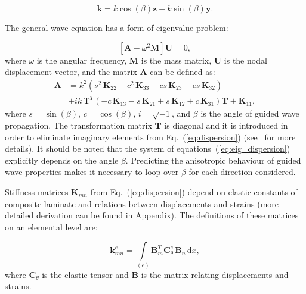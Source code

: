 \documentclass[preprint,12pt]{elsarticle}
\newcommand{\matr}[1]{\mathbf{#1}} %
\newcommand{\vect}[1]{\mathbf{#1}} %
\newcommand{\ud}{\mathrm{d}}
\begin{document}
	\begin{equation}
	  \vect{k} = k \cos (\beta) \vect{z} - k \sin (\beta) \vect{y}.
		\label{eq:wavevector}
	\end{equation}
	
   The general wave equation has a form of eigenvalue problem:

	\begin{equation}
	\left[\matr{A} - \omega^2\matr{M} \right] \vect{U} =0,
	\label{eq:eig_dispersion}
	\end{equation}
	where $\omega$ is the angular frequency, $\matr{M}$ is the mass matrix, $\matr{U}$ is the nodal displacement vector, and the matrix $\matr{A}$ can be defined as:
	\begin{equation}
	\begin{aligned}
	\matr{A} & =  k^2\left(s^2 \,\matr{K}_{22} + c^2\, \matr{K}_{33} - c s\, \matr{K}_{23} - c s\, \matr{K}_{32}\right) \\
	& + i k\, \matr{T}^T\left(-c\, \matr{K}_{13} - s\, \matr{K}_{21} + s\, \matr{K}_{12} + c\, \matr{K}_{31}\right) \matr{T} +\matr{K}_{11},
	\end{aligned}
	\label{eq:dispersion}
	\end{equation}
	where  $s = \sin(\beta)$, $c = \cos(\beta)$, $i = \sqrt{-1}$, and $\beta$ is the angle of guided wave propagation. The transformation matrix $\matr{T}$ is diagonal and it is introduced in order to eliminate imaginary elements from Eq.~(\ref{eq:dispersion}) (see~\cite{Bartoli2006} for more details). It should be noted that the system of equations~(\ref{eq:eig_dispersion}) explicitly depends on the angle $\beta$. Predicting the anisotropic behaviour of guided wave properties makes it necessary to loop over $\beta$ for each direction considered.
	
	Stiffness matrices $\matr{K}_{mn}$ from Eq.~(\ref{eq:dispersion}) depend on elastic constants of composite laminate and relations between displacements and strains (more detailed derivation can be found in Appendix). The definitions of these matrices on an elemental level are:
	
	\begin{equation}
	\matr{k}_{mn}^e= \int \limits_{(e)} \matr{B}_m^{T} \matr{C}_{\theta}^e \, \matr{B}_n\, \ud x, 
	\label{eq:stiffness_matrix_e}
	\end{equation}
	where $\matr{C}_{\theta}$ is the elastic tensor and $\matr{B}$ is the matrix relating displacements and strains.
	
\end{document}
